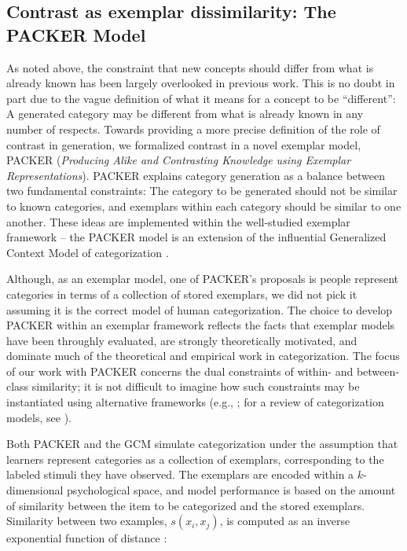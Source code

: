 \documentclass[12pt]{article}
\begin{document}
\begin{flushleft}
\subsection{Contrast as exemplar dissimilarity: The PACKER Model}

\label{section:PACKER-definition}

As noted above, the constraint that new concepts should differ from what is
already known has been largely overlooked in previous work. This is no doubt in
part due to the vague definition of what it means for a concept to be
``different'': A generated category may be different from what is already known
in any number of respects. Towards providing a more precise definition of the
role of contrast in generation, we formalized contrast in a novel exemplar
model, PACKER ({\em Producing Alike and Contrasting Knowledge using Exemplar
  Representations}). PACKER explains category generation as a balance between
two fundamental constraints: The category to be generated should not be similar
to known categories, and exemplars within each category should be similar to one
another. These ideas are implemented within the well-studied exemplar framework
-- the PACKER model is an extension of the influential Generalized Context Model
of categorization \citep[GCM;][]{nosofsky1984choice,nosofsky1986attention}.

Although, as an exemplar model, one of PACKER's proposals is people represent
categories in terms of a collection of stored exemplars, we did not pick it
assuming it is the correct model of human categorization. The choice to develop
PACKER within an exemplar framework reflects the facts that exemplar models have
been throughly evaluated, are strongly theoretically motivated, and dominate
much of the theoretical and empirical work in categorization. The focus of our
work with PACKER concerns the dual constraints of within- and between-class
similarity; it is not difficult to imagine how such constraints may be
instantiated using alternative frameworks (e.g.,
\citealp{kurtz2007divergent,love2004sustain,smith2000thirty}; for a review of
categorization models, see \citealp{pothoswills2011}).

Both PACKER and the GCM simulate categorization under the assumption that
learners represent categories as a collection of exemplars, corresponding to the
labeled stimuli they have observed. The exemplars are encoded within a
$k$-dimensional psychological space, and model performance is based on the
amount of similarity between the item to be categorized and the stored
exemplars. Similarity between two examples, $s\left(x_i, x_j\right)$, is
computed as an inverse exponential function of distance
\citep[following][]{attneave1950,shepard1957stimulus,shepard1987toward}:


\end{flushleft}
\end{document}
